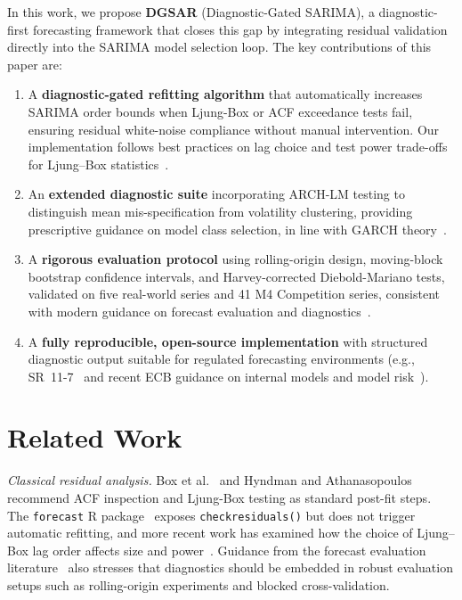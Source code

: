 \documentclass[sn-mathphys-num,pdflatex]{sn-jnl}
\begin{document}
In this work, we propose \textbf{DGSAR} (Diagnostic-Gated SARIMA), a diagnostic-first
forecasting framework that closes this gap by integrating residual
validation directly into the SARIMA model selection loop.
The key contributions of this paper are:
\begin{enumerate}
\item A \textbf{diagnostic-gated refitting algorithm} that
automatically increases SARIMA order bounds when Ljung-Box
or ACF exceedance tests fail, ensuring residual white-noise
compliance without manual intervention. Our implementation
follows best practices on lag choice and test power trade-offs
for Ljung--Box statistics~\cite{ljungbox1978, hassani2020lb}.
\item An \textbf{extended diagnostic suite} incorporating ARCH-LM
testing to distinguish mean mis-specification from volatility
clustering, providing prescriptive guidance on model class
selection, in line with GARCH theory~\cite{engle1982, bollerslev1986garch}.
\item A \textbf{rigorous evaluation protocol} using rolling-origin
design, moving-block bootstrap confidence intervals, and
Harvey-corrected Diebold-Mariano tests, validated on five
real-world series and 41 M4 Competition series, consistent
with modern guidance on forecast evaluation and diagnostics~\cite{tashman2000oos, hewamalage2023pitfalls}.
\item A \textbf{fully reproducible, open-source implementation}
with structured diagnostic output suitable for regulated
forecasting environments (e.g., SR~11-7~\cite{sr117} and recent
ECB guidance on internal models and model risk~\cite{ecb2024guide}).
\end{enumerate}

\section{Related Work}
\label{sec:related}

\textit{Classical residual analysis.}
Box et al.~\cite{box2015time} and Hyndman and
Athanasopoulos~\cite{hyndman2018forecasting} recommend ACF inspection
and Ljung-Box testing as standard post-fit steps. The \texttt{forecast}
R package~\cite{hyndman2018forecasting} exposes \texttt{checkresiduals()}
but does not trigger automatic refitting, and more recent work has
examined how the choice of Ljung--Box lag order affects size and power~\cite{hassani2020lb}.
Guidance from the forecast evaluation literature~\cite{tashman2000oos, bergmeir2012cv, hewamalage2023pitfalls}
also stresses that diagnostics should be embedded in robust evaluation
setups such as rolling-origin experiments and blocked cross-validation.
\end{document}
